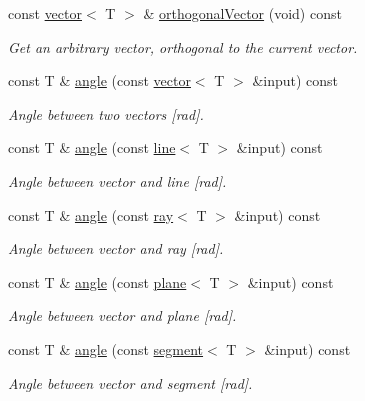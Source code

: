 \begin{DoxyCompactItemize}
const \hyperlink{classddd_1_1vector}{vector}$<$ T $>$ \& \hyperlink{classddd_1_1vector_a3ad5fe35a6b91b17a45af430a2622380}{orthogonal\+Vector} (void) const
\begin{DoxyCompactList}\small\item\em Get an arbitrary vector, orthogonal to the current vector. \end{DoxyCompactList}\item 
const T \& \hyperlink{classddd_1_1vector_ad1a37ce1d1c20c227257fd1fd223c3cf}{angle} (const \hyperlink{classddd_1_1vector}{vector}$<$ T $>$ \&input) const
\begin{DoxyCompactList}\small\item\em Angle between two vectors \mbox{[}rad\mbox{]}. \end{DoxyCompactList}\item 
const T \& \hyperlink{classddd_1_1vector_a97a1359914c22ea1e3928f02fc650bac}{angle} (const \hyperlink{classddd_1_1line}{line}$<$ T $>$ \&input) const
\begin{DoxyCompactList}\small\item\em Angle between vector and line \mbox{[}rad\mbox{]}. \end{DoxyCompactList}\item 
const T \& \hyperlink{classddd_1_1vector_a893bfd1b0209a0a7e7630a3ddf38193d}{angle} (const \hyperlink{classddd_1_1ray}{ray}$<$ T $>$ \&input) const
\begin{DoxyCompactList}\small\item\em Angle between vector and ray \mbox{[}rad\mbox{]}. \end{DoxyCompactList}\item 
const T \& \hyperlink{classddd_1_1vector_a6e6f7e86378329051b53b969bdb607ae}{angle} (const \hyperlink{classddd_1_1plane}{plane}$<$ T $>$ \&input) const
\begin{DoxyCompactList}\small\item\em Angle between vector and plane \mbox{[}rad\mbox{]}. \end{DoxyCompactList}\item 
const T \& \hyperlink{classddd_1_1vector_aa1d50d563f55d5795d565ed70ec5b845}{angle} (const \hyperlink{classddd_1_1segment}{segment}$<$ T $>$ \&input) const
\begin{DoxyCompactList}\small\item\em Angle between vector and segment \mbox{[}rad\mbox{]}. \end{DoxyCompactList}\end{DoxyCompactItemize}


